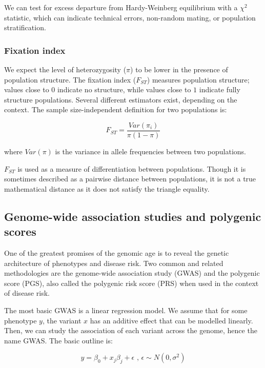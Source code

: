 We can test for excess departure from Hardy-Weinberg equilibrium with a $\chi^2$ statistic, which can indicate technical errors, non-random mating, or population stratification.

\subsubsection{Fixation index}

We expect the level of heterozygosity ($\pi$) to be lower in the presence of population structure. The fixation index ($F_{ST}$) measures population structure; values close to $0$ indicate no structure, while values close to $1$ indicate fully structure populations. Several different estimators exist, depending on the context\citep{bhatia_estimating_2013}. The sample size-independent definition for two populations is:

$$ F_{ST} = \frac{Var(\pi_{i})}{\pi(1-\pi)} $$

where $Var(\pi)$ is the variance in allele frequencies between two populations.

$F_{ST}$ is used as a measure of differentiation between populations. Though it is sometimes described as a pairwise distance between populations, it is not a true mathematical distance as it does not satisfy the triangle equality\citep{arbisser_fst_2020}.


\subsection{Genome-wide association studies and polygenic scores}

One of the greatest promises of the genomic age is to reveal the genetic architecture of phenotypes and disease risk. Two common and related methodologies are the genome-wide association study (GWAS) and the polygenic score (PGS), also called the polygenic risk score (PRS) when used in the context of disease risk.

The most basic GWAS is a linear regression model. We assume that for some phenotype $y$, the variant $x$ has an additive effect that can be modelled linearly. Then, we can study the association of each variant across the genome, hence the name GWAS. The basic outline is:

$$ y = \beta_0 + x_{j}\beta_{j} + \epsilon \text{ , } \epsilon \sim N(0,\sigma^{2})  $$

